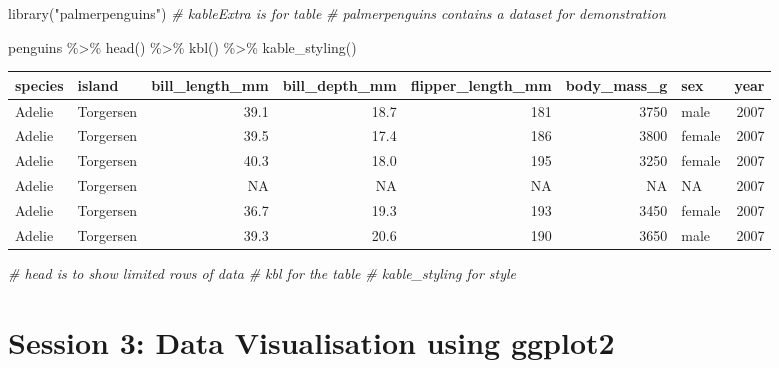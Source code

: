 \documentclass[
]{article}
\newenvironment{Shaded}{\begin{snugshade}}{\end{snugshade}}
\newcommand{\CommentTok}[1]{\textcolor[rgb]{0.56,0.35,0.01}{\textit{#1}}}
\newcommand{\FunctionTok}[1]{\textcolor[rgb]{0.00,0.00,0.00}{#1}}
\newcommand{\NormalTok}[1]{#1}
\newcommand{\SpecialCharTok}[1]{\textcolor[rgb]{0.00,0.00,0.00}{#1}}
\newcommand{\StringTok}[1]{\textcolor[rgb]{0.31,0.60,0.02}{#1}}
\begin{document}
\begin{Shaded}
\begin{Highlighting}[]
\FunctionTok{library}\NormalTok{(}\StringTok{"palmerpenguins"}\NormalTok{)}
\CommentTok{\# kableExtra is for table}
\CommentTok{\# palmerpenguins contains a dataset for demonstration}

\NormalTok{penguins }\SpecialCharTok{\%\textgreater{}\%}
  \FunctionTok{head}\NormalTok{() }\SpecialCharTok{\%\textgreater{}\%}
  \FunctionTok{kbl}\NormalTok{() }\SpecialCharTok{\%\textgreater{}\%}
  \FunctionTok{kable\_styling}\NormalTok{() }
\end{Highlighting}
\end{Shaded}

\begin{table}
\centering
\begin{tabular}[t]{l|l|r|r|r|r|l|r}
\hline
species & island & bill\_length\_mm & bill\_depth\_mm & flipper\_length\_mm & body\_mass\_g & sex & year\\
\hline
Adelie & Torgersen & 39.1 & 18.7 & 181 & 3750 & male & 2007\\
\hline
Adelie & Torgersen & 39.5 & 17.4 & 186 & 3800 & female & 2007\\
\hline
Adelie & Torgersen & 40.3 & 18.0 & 195 & 3250 & female & 2007\\
\hline
Adelie & Torgersen & NA & NA & NA & NA & NA & 2007\\
\hline
Adelie & Torgersen & 36.7 & 19.3 & 193 & 3450 & female & 2007\\
\hline
Adelie & Torgersen & 39.3 & 20.6 & 190 & 3650 & male & 2007\\
\hline
\end{tabular}
\end{table}

\begin{Shaded}
\begin{Highlighting}[]
\CommentTok{\# head is to show limited rows of data}
\CommentTok{\# kbl for the table}
\CommentTok{\# kable\_styling for style}
\end{Highlighting}
\end{Shaded}

\hypertarget{session-3-data-visualisation-using-ggplot2}{%
\section{Session 3: Data Visualisation using
ggplot2}\label{session-3-data-visualisation-using-ggplot2}}
\end{document}
